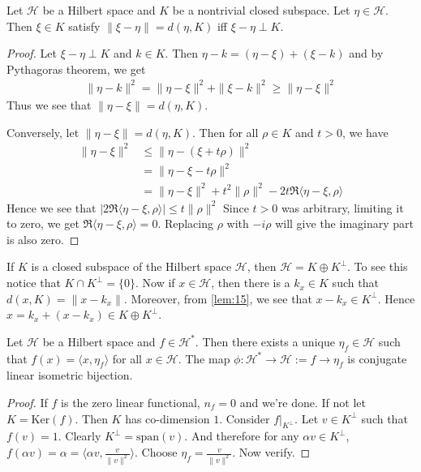 \begin{lemma}
  \label{lem:15}
  Let $\mathcal{H}$ be a Hilbert space and $K$ be a nontrivial closed subspace.
  Let $\eta \in \mathcal{H}$. Then $\xi \in K$ satisfy $\|\xi -
  \eta\| = d(\eta, K)$ iff
  $\xi - \eta \perp K$.
\end{lemma}
\begin{proof}
  Let $\xi - \eta \perp K$ and $k \in K$. Then $\eta - k = (\eta -
  \xi) + (\xi - k)$ and by Pythagoras theorem, we get
  \begin{align*}
    \|\eta - k\|^2 = \|\eta - \xi\|^2 + \|\xi - k\|^2 \ge \|\eta - \xi\|^2
  \end{align*}
  Thus we see that $\|\eta - \xi\| = d(\eta, K)$.

  \marginnote{ \scriptsize  \textcolor{red}{cool proof technique}}
  Conversely, let  $\|\eta - \xi\|= d(\eta, K)$. Then for all $\rho
  \in K$ and $t > 0$, we have
  \begin{align*}
    \|\eta - \xi\|^2 &\le \|\eta - (\xi + t\rho)\|^2  \\
    & = \| \eta - \xi -  t\rho\|^2 \\
    & = \|\eta - \xi\|^2 + t^2\|\rho\|^2 - 2t\Re \langle \eta - \xi ,
    \rho \rangle
  \end{align*}
  Hence we see that $|2\Re \langle \eta - \xi , \rho \rangle| \le t\|\rho\|^2$
  Since $t>0$ was arbitrary, limiting it to zero, we get $\Re \langle
  \eta - \xi ,  \rho \rangle = 0$. Replacing $\rho$ with $-i \rho$
  will give the imaginary part is also zero.
\end{proof}

\begin{remark}
  \label{KplusKperpisX}
  If $K$ is a closed subspace of the Hilbert space $\mathcal{H}$,
  then $\mathcal{H} = K \oplus K^\perp$. To see this notice that $K
  \cap K^\perp = \{ 0 \}$. Now if $x \in \mathcal{H}$, then there is
  a $k_x \in K$ such that $d(x, K) = \|x- k_x\|$. Moreover, from
  \autoref{lem:15}, we see that $x - k_x \in K^\perp$. Hence $x =
  k_x + (x - k_x) \in K \oplus K^\perp$.
\end{remark}

\begin{theorem}
  Let $\mathcal{H}$ be a Hilbert space and $f \in \mathcal{H}^*$.
  Then there exists a
  unique $\eta_f \in \mathcal{H}$ such that $f(x) = \langle x , \eta_f \rangle $
  for all $ x \in \mathcal{H}$. The map $\phi:  \mathcal{H}^* \to
  \mathcal{H} := f \to \eta_f$ is
  conjugate linear isometric bijection.
\end{theorem}
\begin{proof}
  If $f$ is the zero linear functional, $n_f = 0$ and we're done. If
  not let $K  = \textrm{Ker}(f)$. Then $K$ has co-dimension $1$.
  Consider $f|_{K^\perp}$. Let $v \in K^\perp$ such that $f(v) = 1$.
  Clearly $  K^\perp = \textrm{span}(v)$. And therefore for any
  $\alpha  v \in K^\perp$, $f(\alpha  v) = \alpha = \langle \alpha v
  , \frac{v}{\|v\|^2} \rangle $. Choose $\eta_f = \frac{v}{\|v\|^2}$.
  Now verify.
\end{proof}

